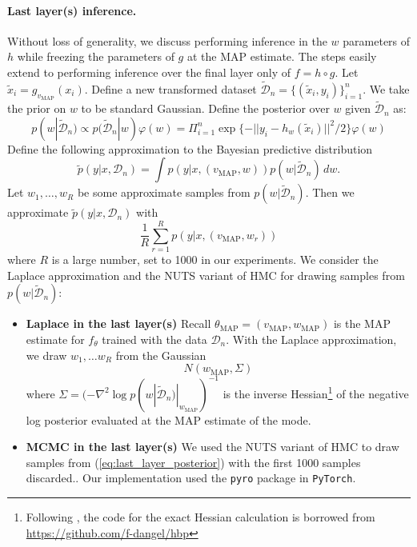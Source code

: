 \documentclass[11pt]{article}
\numberwithin{equation}{section}
\theoremstyle{plain}
\theoremstyle{definition}
\begin{document}
\paragraph{Last layer(s) inference.}
Without loss of generality, we discuss performing inference in the $w$ parameters of $h$ while freezing the parameters of $g$ at the MAP estimate. The steps easily extend to performing inference over the final layer only of $f = h \circ g$. Let $\tilde x_i = g_{v_{\operatorname{MAP}}}(x_i)$. Define a new transformed dataset $\tilde{\mathcal D}_n = \{(\tilde x_i, y_i) \}_{i=1}^n$. We take the prior on $w$ to be standard Gaussian. 
Define the posterior over $w$ given $\tilde{\mathcal D}_n$ as:
\begin{equation}
	p(w | \tilde{\mathcal D}_n) \propto p(\tilde{\mathcal D}_n | w) \varphi(w) = \Pi_{i=1}^n \exp\{-|| y_i - h_w(\tilde x_i) ||^2/2\} \varphi(w)
	\label{eq:last_layer_posterior}
\end{equation}
Define the following approximation to the Bayesian predictive distribution
$$
\tilde p(y|x, \mathcal D_n) = \int p(y|x,(v_{\operatorname{MAP}},w)) p(w|\tilde{\mathcal D}_n) \,dw.
$$
Let $w_1,\ldots,w_R$ be some approximate samples from $p(w | \tilde{\mathcal D}_n)$. Then we approximate $\tilde p(y|x, \mathcal D_n)$ with
\[
\frac{1}{R} \sum_{r=1}^R p(y|x,(v_{\operatorname{MAP}},w_r))
\]
where $R$ is a large number, set to 1000 in our experiments. We consider the Laplace approximation and the NUTS variant of HMC for drawing samples from $p(w | \tilde{\mathcal D}_n)$:

\begin{itemize}
	\item \textbf{Laplace in the last layer(s)}
	Recall $\theta_{\operatorname{MAP}} = (v_{\operatorname{MAP}}, w_{\operatorname{MAP}})$ is the MAP estimate for $f_\theta$ trained with the data $\mathcal D_n$. With the Laplace approximation, we draw $w_1,\ldots w_R$ from the Gaussian
	\[
	N(w_{\operatorname{MAP}}, \Sigma)
	\]
	where $\Sigma = (- \nabla^2 \log p(w| \tilde{\mathcal D}_n) |_{w_{\operatorname{MAP}}})^{-1}$ is the inverse Hessian\footnote{Following \citet{kristiadi_being_2020}, the code for the exact Hessian calculation is borrowed from \url{https://github.com/f-dangel/hbp}} of the negative log posterior evaluated at the MAP estimate of the mode.
	\item \textbf{MCMC in the last layer(s)}
	We used the NUTS variant of HMC to draw samples from (\ref{eq:last_layer_posterior}) with the first 1000 samples  discarded.. Our implementation used the \texttt{pyro} package in \texttt{PyTorch}.
	
\end{itemize}
\end{document}
